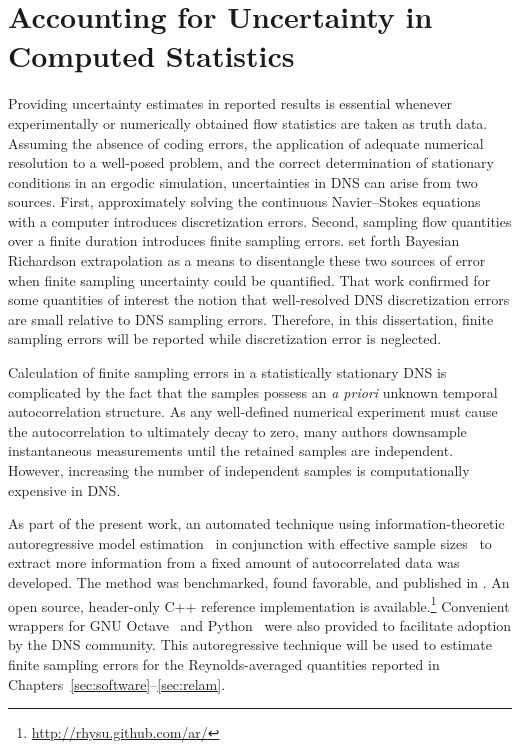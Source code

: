 \section{Accounting for Uncertainty in Computed Statistics}
\label{eq:uqaccounting}

Providing uncertainty estimates in reported results is essential whenever
experimentally or numerically obtained flow statistics are taken as truth data.
Assuming the absence of coding errors, the application of adequate numerical
resolution to a well-posed problem, and the correct determination of stationary
conditions in an ergodic simulation, uncertainties in DNS can arise from two
sources.  First, approximately solving the continuous Navier--Stokes equations
with a computer introduces discretization errors.  Second, sampling flow
quantities over a finite duration introduces finite sampling errors.
\citet{Oliver2014Estimating} set forth Bayesian Richardson extrapolation as a
means to disentangle these two sources of error when finite sampling uncertainty
could be quantified.  That work confirmed for some quantities of
interest the notion that well-resolved DNS discretization errors are small
relative to DNS sampling errors.  Therefore, in this dissertation, finite
sampling errors will be reported while discretization error is neglected.

Calculation of finite sampling errors in a statistically stationary DNS is
complicated by the fact that the samples possess an \emph{a priori} unknown
temporal autocorrelation structure.  As any well-defined numerical experiment
must cause the autocorrelation to ultimately decay to zero, many authors
downsample instantaneous measurements until the retained samples are
independent.  However, increasing the number of independent samples is
computationally expensive in DNS.

As part of the present work,
an automated technique using information-theoretic autoregressive model
estimation~\citep{Box2008Time, Priestley1981SpectralI, Priestley1981SpectralII,
Broersen2002Automatic, Broersen2006Automatic, Broersen2000Finite,
Storch2001Statistical} in conjunction with effective sample
sizes~\citep{Trenberth1984Some} to extract more information from a fixed amount
of autocorrelated data was developed.  The method
was benchmarked, found favorable, and published in
\citet{Oliver2014Estimating}.  An open source, header-only C++ reference
implementation is available.\footnote{\url{http://rhysu.github.com/ar/}}
Convenient wrappers for GNU Octave~\citep{Eaton2008GNU} and
Python~\citep{Drake2011Python} were also provided to facilitate adoption by the
DNS community.  This autoregressive technique will be used to estimate
finite
sampling errors for the Reynolds-averaged quantities
reported in Chapters~\ref{sec:software}--\ref{sec:relam}.

